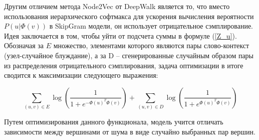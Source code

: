 Другим отличием метода Node2Vec от DeepWalk является то, что вместо использования иерархического софтмакса для ускорения вычисления вероятности $P(u | \Phi(v))$ в SkipGram модели, он использует отрицательное сэмплирование. Идея заключается в том, чтобы уйти от подсчета суммы в формуле (\ref{Z_u}). Обозначая за $E$ множество, элементами которого являются пары слово-контекст (узел-случайное блуждание), а за D -- сгенерированные случайным образом пары из распределения отрицательного сэмплирования, задача оптимизации в итоге сводится к максимизации следующего выражения:

$$
\sum_{(u, v) \in E} \log (\frac{1}{1 + e^{-\Phi(u)^T \Phi(v)}}) + \sum_{(u, v) \in D} \log (\frac{1}{1 + e^{\Phi(u)^T \Phi(v)}}) 
$$

Путем оптимизирования данного функционала, модель учится отличать зависимости между вершинами от шума в виде случайно
выбранных пар вершин.


